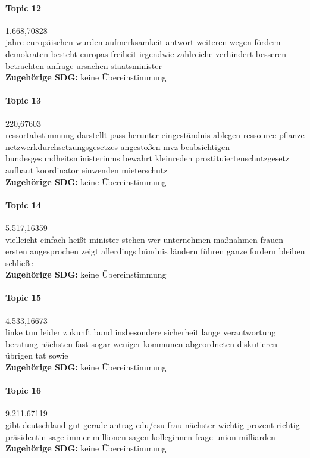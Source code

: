 \documentclass[a4paper,11pt]{article}
\begin{document}
\paragraph{Topic 12} 1.668,70828 \\
jahre europäischen wurden aufmerksamkeit antwort weiteren wegen fördern
demokraten besteht europas freiheit irgendwie zahlreiche verhindert besseren
betrachten anfrage ursachen staatsminister  \\ 
\textbf{Zugehörige SDG:} keine Übereinstimmung
    
\paragraph{Topic 13} 220,67603 \\
ressortabstimmung darstellt pass herunter eingeständnis ablegen ressource
pflanze netzwerkdurchsetzungsgesetzes angestoßen mvz beabsichtigen
bundesgesundheitsministeriums bewahrt kleinreden prostituiertenschutzgesetz
aufbaut koordinator einwenden mieterschutz  \\ 
\textbf{Zugehörige SDG:} keine Übereinstimmung

\paragraph{Topic 14} 5.517,16359 \\
vielleicht einfach heißt minister stehen wer unternehmen maßnahmen frauen
ersten angesprochen zeigt allerdings bündnis ländern führen ganze fordern
bleiben schließe   \\ 
\textbf{Zugehörige SDG:} keine Übereinstimmung 
   
\paragraph{Topic 15} 4.533,16673 \\
linke tun leider zukunft bund insbesondere sicherheit lange verantwortung
beratung nächsten fast sogar weniger kommunen abgeordneten diskutieren übrigen
tat sowie   \\ 
\textbf{Zugehörige SDG:} keine Übereinstimmung 
    
\paragraph{Topic 16} 9.211,67119 \\
gibt deutschland gut gerade antrag cdu/csu frau nächster wichtig prozent
richtig präsidentin sage immer millionen sagen kolleginnen frage union
milliarden  \\
\textbf{Zugehörige SDG:} keine Übereinstimmung 
     
\end{document}
